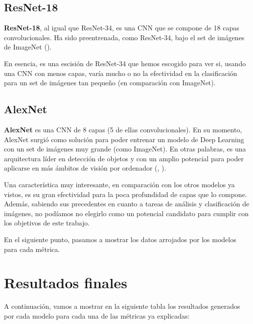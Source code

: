 \subsection{ResNet-18}

\textbf{ResNet-18}, al igual que ResNet-34, es una \ac{CNN} que se compone de 18 capas convolucionales. Ha sido preentrenada, como ResNet-34, bajo el set de imágenes de ImageNet (\cite{resnet18}).

En esencia, es una escisión de ResNet-34 que hemos escogido para ver si, usando una \ac{CNN} con menos capas, varía mucho o no la efectividad en la clasificación para un set de imágenes tan pequeño (en comparación con ImageNet).

\subsection{AlexNet}

\textbf{AlexNet} es una \ac{CNN} de 8 capas (5 de ellas convolucionales). En su momento, AlexNet surgió como solución para poder entrenar un modelo de Deep Learning con un set de imágenes muy grande (como ImageNet). En otras palabras, es una arquitectura líder en detección de objetos y con un amplio potencial para poder aplicarse en más ámbitos de visión por ordenador (\cite{alexnet}, \cite{alexnet-2}).

Una característica muy interesante, en comparación con los otros modelos ya vistos, es su gran efectividad para la poca profundidad de capas que lo compone. Además, sabiendo sus precedentes en cuanto a tareas de análisis y clasificación de imágenes, no podíamos no elegirlo como un potencial candidato para cumplir con los objetivos de este trabajo.

En el siguiente punto, pasamos a mostrar los datos arrojados por los modelos para cada métrica.

\newpage

\section{Resultados finales}

A continuación, vamos a mostrar en la siguiente tabla los resultados generados por cada modelo para cada una de las métricas ya explicadas:

